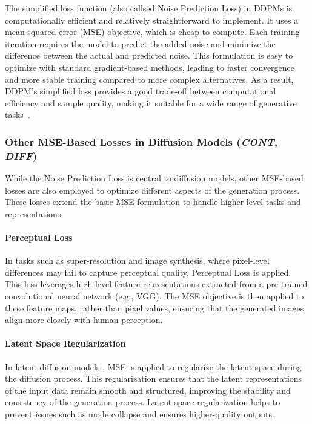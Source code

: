 \documentclass[sn-mathphys-num]{sn-jnl}%
\newcommand \cont{\textit{CONT}}
\newcommand \diff{\textit{DIFF}}
\begin{document}
The simplified loss function (also callsed Noise Prediction Loss) in DDPMs is computationally efficient and relatively straightforward to implement. It uses a mean squared error (MSE) objective, which is cheap to compute. Each training iteration requires the model to predict the added noise and minimize the difference between the actual and predicted noise. This formulation is easy to optimize with standard gradient-based methods, leading to faster convergence and more stable training compared to more complex alternatives. As a result, DDPM's simplified loss provides a good trade-off between computational efficiency and sample quality, making it suitable for a wide range of generative tasks~\cite{ho2020denoising}.

\subsubsection{Other MSE-Based Losses in Diffusion Models (\cont, \diff)}\label{subsubsec-generative_other_mse_losses}
While the Noise Prediction Loss is central to diffusion models, other MSE-based losses are also employed to optimize different aspects of the generation process. These losses extend the basic MSE formulation to handle higher-level tasks and representations:

\paragraph{Perceptual Loss} 
In tasks such as super-resolution and image synthesis, where pixel-level differences may fail to capture perceptual quality, Perceptual Loss \cite{rombach2022high} is applied. This loss leverages high-level feature representations extracted from a pre-trained convolutional neural network (e.g., VGG). The MSE objective is then applied to these feature maps, rather than pixel values, ensuring that the generated images align more closely with human perception.

\paragraph{Latent Space Regularization} 
In latent diffusion models \cite{rombach2022high}, MSE is applied to regularize the latent space during the diffusion process. This regularization ensures that the latent representations of the input data remain smooth and structured, improving the stability and consistency of the generation process. Latent space regularization helps to prevent issues such as mode collapse and ensures higher-quality outputs.
\end{document}
